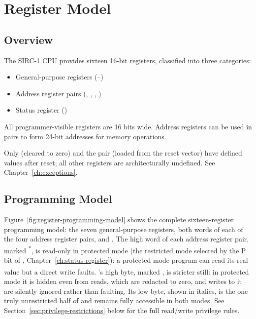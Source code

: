 \chapter{Register Model}
\label{ch:registers}

\section{Overview}

The SIRC-1 CPU provides sixteen 16-bit registers, classified into three categories:

\begin{itemize}
	\item General-purpose registers (--)
	\item Address register pairs (, , , )
	\item Status register ()
\end{itemize}

All programmer-visible registers are 16 bits wide. Address registers can be used in pairs to form 24-bit addresses for
memory operations.

Only  (cleared to zero) and the  pair (loaded from the reset vector) have defined values after reset;
all other registers are architecturally undefined. See Chapter~\ref{ch:exceptions}.

\section{Programming Model}

Figure~\ref{fig:register-programming-model} shows the complete sixteen-register programming model: the seven
general-purpose registers, both words of each of the four address register pairs, and . The high word of each
address register pair, marked \textsuperscript{*}, is read-only in protected mode (the restricted mode selected by the
P bit of , Chapter~\ref{ch:status-register}): a protected-mode program can read its real value but a direct
write faults. 's high byte, marked \textsuperscript{\dag}, is stricter still: in protected mode it is hidden
even from reads, which are redacted to zero, and writes to it are silently ignored rather than faulting. Its low byte,
shown in italics, is the one truly unrestricted half of  and remains fully accessible in both modes. See
Section~\ref{sec:privilege-restrictions} below for the full read/write privilege rules.

